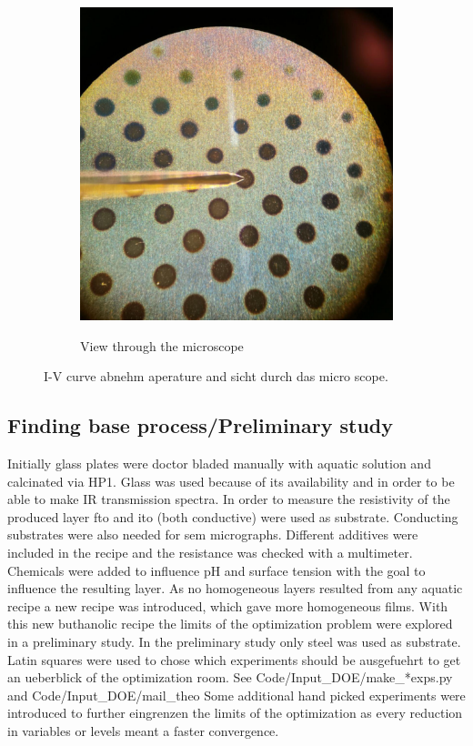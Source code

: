 \documentclass[a4paper]{article}
\begin{document}
\begin{figure}
\begin{subfigure}{0.48\textwidth}
		\includegraphics[width=.9\textwidth]{Pics/i-v-micro.png}
		\label{fig:iv-micro}
		\caption{View through the microscope}
	\end{subfigure}
	\label{fig:iv}
	\caption{I-V curve abnehm aperature and sicht durch das micro scope.}
\end{figure}

\subsection{Finding base process/Preliminary study}
Initially glass plates were doctor bladed manually with aquatic solution and calcinated via HP1. 
Glass was used because of its availability and in order to be able to make IR transmission spectra.
In order to measure the resistivity of the produced layer \gls{fto} and \gls{ito} (both conductive) were used as substrate.
Conducting substrates were also needed for \gls{sem} micrographs. 
Different additives were included in the recipe and the resistance was checked with a multimeter. 
Chemicals were added to influence pH and surface tension with the goal to influence the resulting layer. 
As no homogeneous layers resulted from any aquatic recipe a new recipe was introduced, which gave more homogeneous films.
With this new buthanolic recipe the limits of the optimization problem were explored in a preliminary study.
In the preliminary study only steel was used as substrate.
Latin squares were used to chose which experiments should be ausgefuehrt to get an ueberblick of the optimization room.
See Code/Input_DOE/make_*exps.py and Code/Input_DOE/mail_theo
Some additional hand picked experiments were introduced to further eingrenzen the limits of the optimization as every reduction in variables or levels meant a faster convergence.
\end{document}
